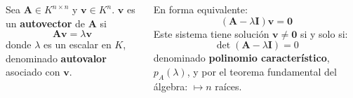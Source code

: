 \documentclass[9pt, aspectratio=169]{beamer}
\begin{document}
\begin{frame}
	\begin{columns}[t]
		\cx
		\begin{definition}
			Sea $\bm{A} \in K^{n \times n}$ y $\bm{v} \in K^n$. $\bm{v}$ es un \textbf{autovector} de $\bm{A}$ si
			\[ \bm{A} \bm{v} = \lambda \bm{v} \]
			donde $\lambda$ es un escalar en $K$, denominado \textbf{autovalor} asociado con $\bm{v}$.
		\end{definition}  \pause
		En forma equivalente:
		\begin{equation}
			(\bm{A} - \lambda \bm{I}) \bm{v} = \bm{0}
			\label{eq:avv01}
		\end{equation}
		Este sistema tiene solución $\bm{v} \neq \bm{0}$ si y solo si:
		\[ \det(\bm{A} - \lambda \bm{I}) = 0 \]
		denominado \textbf{polinomio característico}, $p_A(\lambda)$, y por el teorema fundamental del álgebra: $\mapsto n$ raíces.
		\pause


\end{columns}
\end{frame}
\end{document}
